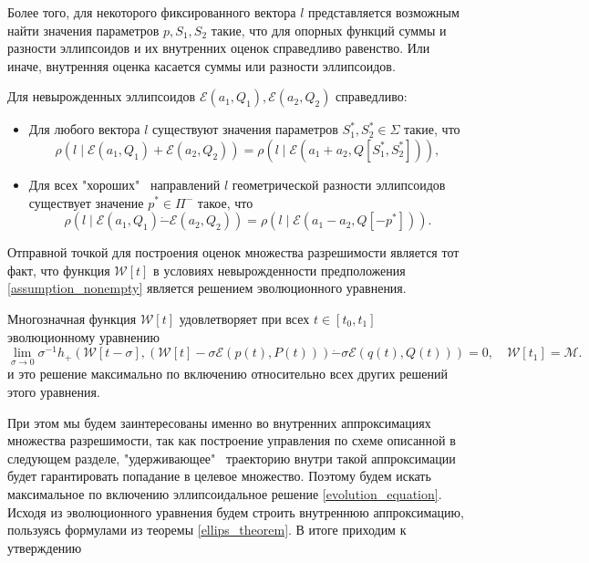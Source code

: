 Более того, для некоторого фиксированного вектора \( l \) представляется возможным найти значения параметров
\( p, S_1, S_2 \) такие, что для опорных функций суммы и разности эллипсоидов и их внутренних оценок справедливо
равенство. Или иначе, внутренняя оценка касается суммы или разности эллипсоидов.

\begin{theorem}
    Для невырожденных эллипсоидов \( \mathcal{E}(a_1, Q_1), \mathcal{E}(a_2, Q_2) \) справедливо:
    \begin{itemize}
        \item Для любого вектора \( l \) существуют значения параметров \( S_1^*, S_2^* \in \Sigma \) такие, что
        \begin{equation*}
            \rho(l \mid \mathcal{E}(a_1, Q_1) + \mathcal{E}(a_2, Q_2)) = \rho(l \mid \mathcal{E}(a_1 + a_2, Q[S_1^*, S_2^*])),
        \end{equation*}
        \item Для всех "хороших" \ направлений \( l \) геометрической разности эллипсоидов существует значение \( p^* \in \Pi^- \) такое, что
        \begin{equation*}
            \rho(l \mid \mathcal{E}(a_1, Q_1) \dot{-} \mathcal{E}(a_2, Q_2)) = \rho(l \mid \mathcal{E}(a_1 - a_2, Q[-p^*])).
        \end{equation*}
    \end{itemize}
\end{theorem}


Отправной точкой для построения оценок множества разрешимости является тот факт, что функция 
 \( \mathcal{W}[t] \) в условиях невырожденности предположения \eqref{assumption_nonempty} является 
 решением эволюционного уравнения.

\begin{theorem}
    Многозначная функция \( \mathcal{W}[t] \) удовлетворяет при всех \( t \in [t_0, t_1 ]\) 
     эволюционному уравнению
    \begin{equation}\label{evolution_equation}
        \lim_{\sigma \to 0} \sigma^{-1} h_+ \left( \mathcal{W}[t - \sigma], \left( \mathcal{W}[t] - 
         \sigma \mathcal{E}(p(t), P(t)) \right) \dot{-} \sigma \mathcal{E}(q(t), Q(t)) \right) = 0,
         \quad \mathcal{W}[t_1] = \mathcal{M}.
    \end{equation}
    и это решение максимально по включению относительно всех других решений этого уравнения. 
\end{theorem}

При этом мы будем заинтересованы именно во внутренних аппроксимациях множества разрешимости, так как
 построение управления по схеме описанной в следующем разделе, "удерживающее" \ траекторию внутри такой
 аппроксимации будет гарантировать попадание в целевое множество. Поэтому будем искать максимальное 
 по включению эллипсоидальное решение \eqref{evolution_equation}. Исходя из эволюционного уравнения будем
 строить внутреннюю аппроксимацию, пользуясь формулами из теоремы \eqref{ellips_theorem}. В итоге приходим
 к утверждению

